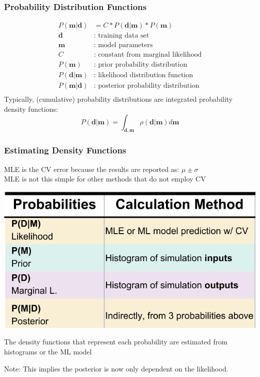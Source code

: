 
\begin{frame}
  \frametitle{Probability Distribution Functions}
  \begin{align*}
    P(\boldsymbol{m}|\boldsymbol{d}) &= C*P(\boldsymbol{d}|\boldsymbol{m})*P(\boldsymbol{m})\\
    \boldsymbol{d} &\text{: training data set}\\
    \boldsymbol{m} &\text{: model parameters}\\
    C &\text{: constant from marginal likelihood}\\
    P(\boldsymbol{m}) &\text{: prior probability distribution}\\
    P(\boldsymbol{d}|\boldsymbol{m}) &\text{: likelihood distribution function}\\
    P(\boldsymbol{m}|\boldsymbol{d}) &\text{: posterior probability distribution}\\
  \end{align*}
  Typically, (cumulative) probability distributions are integrated probability density functions:
  $$ P(\boldsymbol{d}|\boldsymbol{m}) = \int_{\boldsymbol{d}, \boldsymbol{m}} \rho(\boldsymbol{d}|\boldsymbol{m}) d\boldsymbol{m} $$
\end{frame}

\begin{frame}
  \frametitle{Estimating Density Functions}
  \begin{minipage}{0.4\textwidth} 
    \small
    MLE is the CV error because the results are reported as: 
    $\mu \pm \sigma$ \cite{scikit} \\ \vfill   
    MLE is not this simple for other methods that do not employ CV
    \cite{gentle_bayes, bayes_compare}
  \end{minipage}\hfill
  \begin{minipage}{0.5\textwidth} 
    \begin{table}
      \centering
      \includegraphics[width=\linewidth]{./figures/bayes-ch4.png}
      \caption{The density functions that represent each probability are estimated from histograms or the ML model}
    \end{table}
    \footnotesize
    Note: This implies the posterior is now only dependent on the likelihood.
  \end{minipage}
\end{frame}

